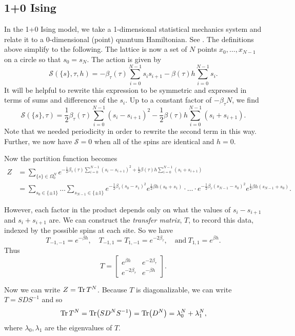 \documentclass[11pt,reqno]{amsart}
\begin{document}
	\subsection{1+0 Ising}
	
	In the 1+0 Ising model, we take a 1-dimensional statistical mechanics system and relate it to a 0-dimensional (point) quantum Hamiltonian. See \cite{FradkinSusskind78,KogutGaugeSummary}.
	The definitions above simplify to the following. The lattice is now a set of $N$ points $x_0,\ldots,x_{N-1}$ on a circle so that $s_0=s_N$. The action is given by 
		\[\mathcal{S}(\{s\},\tau, h)=-\beta_\tau(\tau)\sum_{i=0}^{N-1} s_is_{i+1} - \beta(\tau)h\sum_{i=0}^{N-1}s_i. \] 
	It will be helpful to rewrite this expression to be symmetric and expressed in terms of sums and differences of the $s_i$. 
	Up to a constant factor of $-\beta_\tau N$, we find
		\[\mathcal{S}(\{s\},\tau)=\frac{1}{2}\beta_\tau(\tau)\sum_{i=0}^{N-1} (s_i-s_{i+1})^2 - \frac{1}{2}\beta(\tau)h\sum_{i=0}^{N-1}(s_i+s_{i+1}). \]
	Note that we needed periodicity in order to rewrite the second term in this way. Further, we now have $\mathcal{S}=0$ when all of the spins are identical and $h=0$.
	
	Now the partition function becomes 
	\begin{align*}
		Z&=\sum_{\{s\}\in\Omega_0^N} e^{-\frac{1}{2}\beta_\tau(\tau)\sum_{i=0}^{N-1} (s_i-s_{i+1})^2 + \frac{1}{2}\beta(\tau)h\sum_{i=0}^{N-1}(s_i+s_{i+1})} \\
		&=\sum_{s_0 \in \{\pm 1\}} \ldots \sum_{s_{N-1}\in \{\pm 1\}} e^{-\frac{1}{2}\beta_\tau (s_0-s_1)^2}e^{\frac{1}{2}\beta h(s_0+s_1)}\cdot\ldots\cdot e^{-\frac{1}{2}\beta_\tau (s_{N-1}-s_0)^2}e^{\frac{1}{2}\beta h(s_{N-1}+s_0)}.
	\end{align*}
	
	However, each factor in the product depends only on what the values of $s_i-s_{i+1}$ and $s_i+s_{i+1}$ are. 
	We can construct the \emph{transfer matrix}, $T$, to record this data, indexed by the possible spins at each site.
	So we have 
	\[T_{-1,-1}=e^{-\beta h}, \quad T_{-1,1}=T_{1,-1}=e^{-2\beta_\tau}, \quad \text{and}\ T_{1,1}=e^{\beta h}. \] 
	Thus \[T=\begin{bmatrix}
	e^{\beta h} & e^{-2\beta_\tau} \\
	e^{-2\beta_\tau} & e^{-\beta h}
	\end{bmatrix}. \]
	
	Now we can write $Z=\Tr T^N$.
	Because $T$ is diagonalizable, we can write $T=SDS^{-1}$ and so 
		\[\Tr T^N=\Tr(SD^NS^{-1})=\Tr(D^N)=\lambda_0^N+\lambda_1^N,\]
	where $\lambda_0,\lambda_1$ are the eigenvalues of $T$.
	
\end{document}
